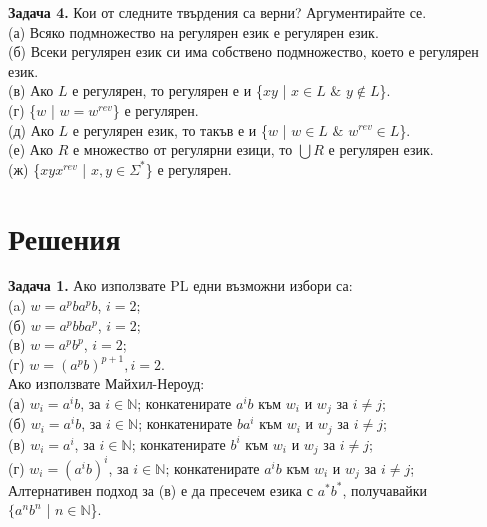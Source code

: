 \documentclass{article}
\begin{document}
    \vspace{15pt}

    \textbf{Задача 4.} Кои от следните твърдения са верни? Аргументирайте се.\\
    (а) Всяко подмножество на регулярен език е регулярен език. \\
    (б) Всеки регулярен език си има собствено подмножество, което е регулярен език. \\
    (в) Ако $L$ е регулярен, то регулярен е и \{$xy$ | $x \in L$ $\&$ $y \notin L$\}. \\
    (г) \{$w$ | $w = w^{rev}$\} е регулярен. \\
    (д) Ако $L$ е регулярен език, то такъв е и \{$w$ | $w \in L$ $\&$ $w^{rev} \in L$\}. \\
    (е) Ако $R$ е множество от регулярни езици, то $\bigcup R$ е регулярен език. \\
    (ж) \{$xyx^{rev}$ | $x,y \in \Sigma^*$\} е регулярен.
\vspace{25pt}

\section{Решения}
    \textbf{Задача 1.} Ако използвате PL едни възможни избори са: \\
    (a) $w = a^pba^pb$, $i = 2$; \\
    (б) $w = a^pbba^p$, $i = 2$; \\
    (в) $w = a^pb^p$, $i = 2$; \\
    (г) $w = (a^pb)^{p+1}, i = 2$. \\
    Ако използвате Майхил-Нероуд: \\
    (а) $w_i = a^ib$, за $i \in \mathbb{N}$; конкатенирате $a^ib$ към $w_i$ и $w_j$ за $i \neq j$; \\
    (б) $w_i = a^ib$, за $i \in \mathbb{N}$; конкатенирате $ba^i$ към $w_i$ и $w_j$ за $i \neq j$; \\
    (в) $w_i = a^i$, за $i \in \mathbb{N}$; конкатенирате $b^i$ към $w_i$ и $w_j$ за $i \neq j$; \\
    (г) $w_i = (a^ib)^{i}$, за $i \in \mathbb{N}$; конкатенирате $a^ib$ към $w_i$ и $w_j$ за $i \neq j$; \\
    \vspace{5pt}
    Алтернативен подход за (в) е да пресечем езика с $a^*b^*$, получавайки \\ $\{a^nb^n$ | $n \in \mathbb{N}$\}.

    \vspace{15pt}
\end{document}
